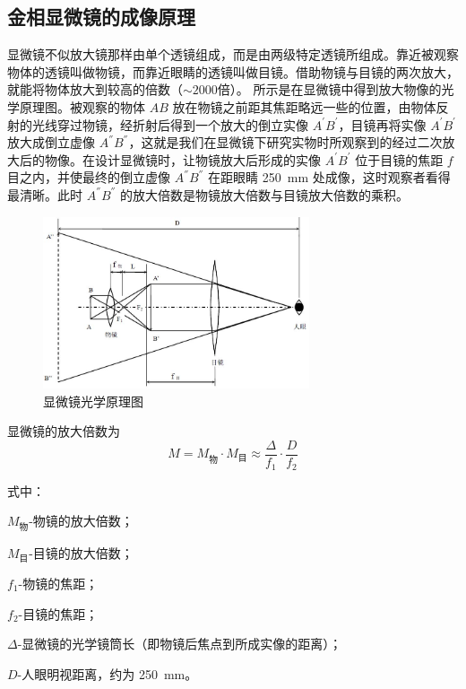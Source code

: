 \documentclass[a4paper,utf8]{article}
\begin{document}
    \subsection{金相显微镜的成像原理}
        显微镜不似放大镜那样由单个透镜组成，而是由两级特定透镜所组成。靠近被观察物体的透镜叫做物镜，而靠近眼睛的透镜叫做目镜。借助物镜与目镜的两次放大，就能将物体放大到较高的倍数（$\sim 2000$倍）。 所示是在显微镜中得到放大物像的光学原理图。被观察的物体 $AB$ 放在物镜之前距其焦距略远一些的位置，由物体反射的光线穿过物镜，经折射后得到一个放大的倒立实像 $A^{'}B^{'}$，目镜再将实像 $A^{'}B^{'}$ 放大成倒立虚像 $A^{''}B^{''}$，这就是我们在显微镜下研究实物时所观察到的经过二次放大后的物像。在设计显微镜时，让物镜放大后形成的实像 $A^{'}B^{'}$ 位于目镜的焦距 $f$ 目之内，并使最终的倒立虚像 $A^{''}B^{''}$ 在距眼睛 \SI{250}{\mm} 处成像，这时观察者看得最清晰。此时 $A^{''}B^{''}$ 的放大倍数是物镜放大倍数与目镜放大倍数的乘积。
        \begin{figure}[!ht]
            \caption{显微镜光学原理图\label{fig:microscope}}
            \includegraphics[width=0.7\textwidth]{microscope.jpg}
        \end{figure}\par
        显微镜的放大倍数为
        \begin{equation}
            M=M_\text{物}\cdot M_\text{目}\approx\frac{\Delta}{f_1}\cdot\frac D{f_2}
            \label{equ:1}
        \end{equation}\par
        式中：
        \begin{minipage}[t]{100mm}
            $M_\text{物}$-物镜的放大倍数；\par
            $M_\text{目}$-目镜的放大倍数；\par
            $f_1$-物镜的焦距；\par
            $f_2$-目镜的焦距；\par
            $\Delta$-显微镜的光学镜筒长（即物镜后焦点到所成实像的距离）；\par
            $D$-人眼明视距离，约为 \SI{250}{\mm}。\par
        \end{minipage}
\end{document}

